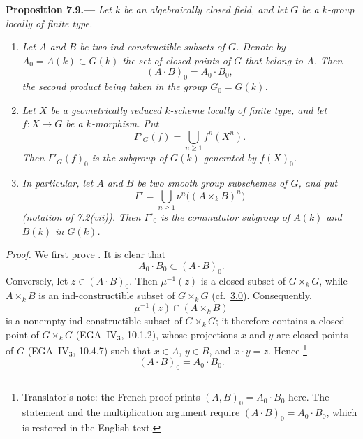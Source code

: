 
\medskip
{}\label{prop:sga3-VIB-7.9}%
\noindent\textbf{Proposition 7.9.---}%
\emph{Let \(k\) be an algebraically closed field, and let \(G\)
be a \(k\)-group locally of finite type.}
\begin{enumerate}
\item[\textup{\SGAInlineRefTarget{prop:sga3-VIB-7.9:item:i}(i)}]\label{concl:sga3-VIB-7.9-i}
  \emph{Let \(A\) and \(B\) be two ind-constructible subsets
  of \(G\). Denote by \(A_0=A(k)\subset G(k)\) the set of closed
  points of \(G\) that belong to \(A\). Then}
  \[
    (A\cdot B)_0=A_0\cdot B_0,
  \]
  \emph{the second product being taken in the group
  \(G_0=G(k)\).}

\item[\textup{\SGAInlineRefTarget{prop:sga3-VIB-7.9:item:ii}(ii)}]\label{concl:sga3-VIB-7.9-ii}
  \emph{Let \(X\) be a geometrically reduced \(k\)-scheme
  locally of finite type, and let \(f:X\to G\) be a
  \(k\)-morphism. Put}
  \[
    \Gamma'_G(f)=
      \bigcup_{n\geq1}f^n(X^n).
  \]
  \emph{Then \(\Gamma'_G(f)_0\) is the subgroup of \(G(k)\)
  generated by \(f(X)_0\).}

\item[\textup{(iii)}]\label{concl:sga3-VIB-7.9-iii}
  \emph{In particular, let \(A\) and \(B\) be two smooth
  group subschemes of \(G\), and put}
  \[
    \Gamma'=
      \bigcup_{n\geq1}
        \nu^n\bigl((A\times_k B)^n\bigr)
  \]
  \emph{\textup{(}notation of
  \hyperref[def:sga3-VIB-7.2-vii]{7.2\textup{(vii)}}\textup{)}. Then
  \(\Gamma'_0\) is the commutator subgroup of \(A(k)\) and
  \(B(k)\) in \(G(k)\).}
\end{enumerate}

\emph{Proof.}
We first prove \textup{}. It is clear that
\[
  A_0\cdot B_0\subset(A\cdot B)_0.
\]
Conversely, let \(z\in(A\cdot B)_0\). Then
\(\mu^{-1}(z)\) is a closed subset of \(G\times_kG\), while
\(A\times_kB\) is an ind-constructible subset of
\(G\times_kG\) (cf.\ \hyperref[par:sga3-VIB-3.0]{3.0}).
Consequently,
\[
  \mu^{-1}(z)\cap(A\times_kB)
\]
is a nonempty ind-constructible subset of \(G\times_kG\); it
therefore contains a closed point of \(G\times_kG\)
(EGA~IV\(_3\), 10.1.2), whose projections \(x\) and \(y\) are
closed points of \(G\) (EGA~IV\(_3\), 10.4.7) such that
\(x\in A\), \(y\in B\), and \(x\cdot y=z\). Hence
\begingroup
\renewcommand{\thefootnote}{\fnsymbol{footnote}}%
\footnote[1]{\label{note:sga3-VIB-7.9-product}Translator's note:
the French proof prints \((A,B)_0=A_0\cdot B_0\) here.
The statement and the multiplication argument require
\((A\cdot B)_0=A_0\cdot B_0\), which is restored in the
English text.}%
\endgroup
\[
  (A\cdot B)_0=A_0\cdot B_0.
\]

